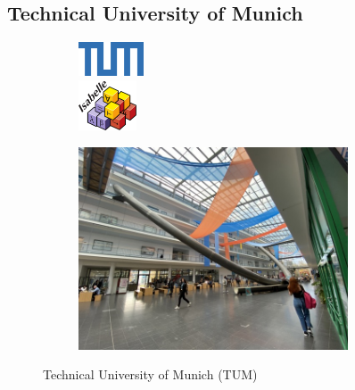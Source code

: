 \documentclass{beamer}
\theoremstyle{definition}
\begin{document}
\begin{frame}
{\begin{figure}
    \end{figure}
    }
\end{frame}

\subsection{Technical University of Munich}

\begin{frame}
    \begin{figure}
        \begin{subfigure}{0.3\textwidth}
            \centering
            \includegraphics[height=1cm]{../img/logoTUM.png}\\
            \vspace*{1cm}
            \includegraphics[height=1.5cm]{../img/logoisabelle.png}
        \end{subfigure}
        \begin{subfigure}{0.69\textwidth}
            \centering
            \includegraphics[height=6cm]{img/TUM.jpeg}
        \end{subfigure}
        \caption{Technical University of Munich (TUM)}
    \end{figure}
\end{frame}
\end{document}
